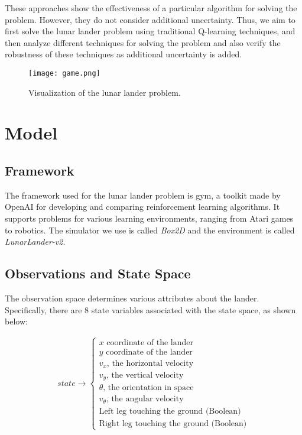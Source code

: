 \documentclass[10pt, conference]{IEEEtran}
\begin{document}
These approaches show the effectiveness of a particular algorithm for solving the problem. However, they do not consider additional uncertainty. Thus, we aim to first solve the lunar lander problem using traditional Q-learning techniques, and then analyze different techniques for solving the problem and also verify the robustness of these techniques as additional uncertainty is added. 

\begin{figure}[!t]
    \centerline{
    \texttt{[image: game.png]}}
    \caption{Visualization of the lunar lander problem.}
    \label{fig:vis_game}
\end{figure}

\section{Model}
\subsection{Framework}
The framework used for the lunar lander problem is gym, a toolkit made by OpenAI \cite{brockman2016openai} for developing and comparing reinforcement learning algorithms. It supports problems for various learning environments, ranging from Atari games to robotics. The simulator we use is called \textit{Box2D} and the environment is called \textit{LunarLander-v2}.
\subsection{Observations and State Space}
The observation space determines various attributes about the lander. Specifically, there are 8 state variables associated with the state space, as shown below:

    \begin{align*}
        state\rightarrow\left\{
        \begin{array}{ll}
            \text{$x$ coordinate of the lander}   \\
             \text{$y$ coordinate of the lander}  \\
            \text{$v_x$, the horizontal velocity} \\
            \text{$v_y$, the vertical velocity}  \\
            \text{$\theta$, the orientation in space} \\
            \text{$v_{\theta}$, the angular velocity}\\
            \text{Left leg touching the ground (Boolean)}\\
            \text{Right leg touching the ground (Boolean)}
        \end{array}
        \right.
    \end{align*}
\end{document}
